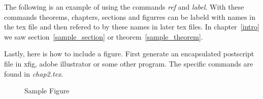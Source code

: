 

	The following is an example of using the commands \textit{ref}
	and \textit{label}. With these commands theorems, chapters,
	sections and figurres can be labeld with names in the tex file
	and then refered to by these names in later tex files. In
	chapter~\ref{intro} we saw section~\ref{sample_section} or
	theorem~\ref{sample_theorem}.

	Lastly, here is how to include a figure. First generate an
	encapsulated postscript file in xfig, adobe illustrator or
	some other program. The specific commands are found in
	\textit{chap2.tex}.

        \begin{figure}[htb]
        \centerline{ }
        \caption{Sample Figure}
        \label{sample_figure}
        \end{figure}

